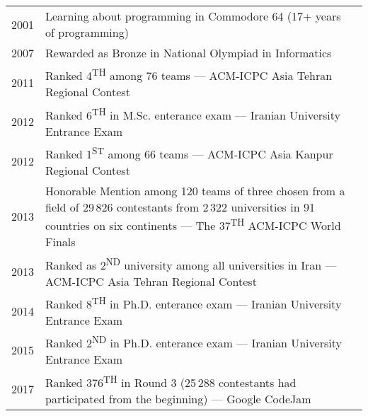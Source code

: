 \documentclass[a4paper,10pt]{article}
\newcommand{\follownote}[1]{--- {\footnotesize\color{darkblue}#1}}
\begin{document}
\begin{tabular}{p{1cm}lN}
2001 & \parbox[t]{11cm}{
	Learning about programming in Commodore 64
	    (17+ years of programming)
} &\\[5mm]

2007 & \parbox[t]{11cm}{
	Rewarded as Bronze in National Olympiad in Informatics
} &\\[5mm]

2011 & \parbox[t]{11cm}{
	Ranked 4\textsuperscript{TH} among 76 teams 
	    \follownote{ACM-ICPC Asia Tehran Regional Contest}
} &\\[5mm]

2012 & \parbox[t]{11cm}{
	Ranked 6\textsuperscript{TH} in M.Sc. enterance exam
	    \follownote{Iranian University Entrance Exam}
} &\\[5mm]

2012 & \parbox[t]{11cm}{
	Ranked 1\textsuperscript{ST} among 66 teams
	    \follownote{ACM-ICPC Asia Kanpur Regional Contest}
} &\\[5mm]

2013 & \parbox[t]{11cm}{
	Honorable Mention among 120 teams of three chosen from a
	    field of 29\,826 contestants from 2\,322 universities in 91
	    countries on six continents
	    \follownote{The 37\textsuperscript{TH} ACM-ICPC World Finals}
} &\\[5mm]

2013 & \parbox[t]{11cm}{
	Ranked as 2\textsuperscript{ND} university among all
	    universities in Iran
	    \follownote{ACM-ICPC Asia Tehran Regional Contest}
} &\\[5mm]

2014 & \parbox[t]{11cm}{
	Ranked 8\textsuperscript{TH} in Ph.D. enterance exam
	    \follownote{Iranian University Entrance Exam}
} &\\[5mm]

2015 & \parbox[t]{11cm}{
	Ranked 2\textsuperscript{ND} in Ph.D. enterance exam
	    \follownote{Iranian University Entrance Exam}
} &\\[5mm]

2017 & \parbox[t]{11cm}{
	Ranked 376\textsuperscript{TH} in Round 3 (25\,288 contestants
	    had participated from the beginning)
	    \follownote{Google CodeJam}
} &\\[5mm]
\end{tabular}
\end{document}
